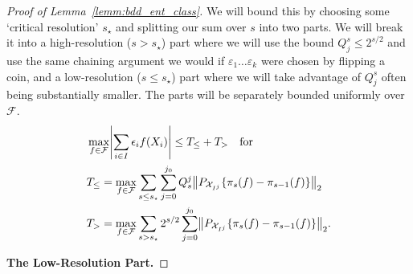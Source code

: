 \documentclass{article}
\DeclarePairedDelimiter\norm{\lVert}{\rVert}
\DeclarePairedDelimiter\abs{\lvert}{\rvert}
\theoremstyle{definition}
\newcommand{\calF}{\ensuremath{\mathcal{F}}}
\newcommand{\calX}{\ensuremath{\mathcal{X}}}
\newcommand{\F}{\ensuremath{\mathcal{F}}}
\newcommand{\<}{\langle}
\renewcommand{\>}{\rangle}
\begin{document}
\begin{refsection}
\begin{proof}[Proof of Lemma~\ref{lemm:bdd_ent_class}]
We will bound this by choosing some `critical resolution' $s_\star$ and splitting our sum over $s$ into two parts.
We will break it into a high-resolution ($s > s_\star$) part where we will use the bound $Q_j^s \le 2^{s/2}$ and use the same chaining argument we would if $\varepsilon_1 \ldots \varepsilon_k$ were chosen by flipping a coin, and a low-resolution ($s \le s_\star$) part where we will take advantage of $Q_j^s$ often being substantially smaller. The parts will be separately bounded uniformly over $\F$.
$$
\begin{aligned}
& \max_{f \in \calF}\abs*{\sum_{i \in I} \epsilon_i f(X_i)} \le  T_{\le} + T_{>} \quad \text{for} \\
&T_{\le} = \max_{f \in \calF} \sum_{s \le s_\star} \sum_{j=0}^{j_0} Q^{j}_s \norm*{P_{\calX_{I^j}}\{\pi_s(f) - \pi_{s-1}(f)\}}_2 \\
&T_{>}   = \max_{f \in \calF} \sum_{s > s_\star} 2^{s/2} \sum_{j=0}^{j_0}  \norm*{P_{\calX_{I^j}}\{\pi_s(f) - \pi_{s-1}(f)\}}_2.
\end{aligned}
$$


\noindent\textbf{The Low-Resolution Part.}


\end{proof}
\end{refsection}
\end{document}
